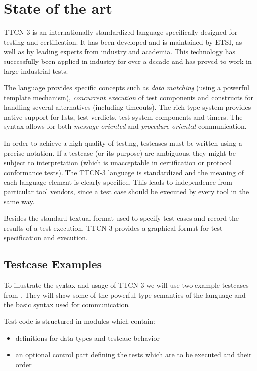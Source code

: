 \chapter{State of the art}
\label{chap:background}

\ac{TTCN-3} is an internationally standardized language
specifically designed for testing and certification.
It has been developed and is maintained by \ac{ETSI},
as well as by leading experts from industry and academia.
This technology has successfully been applied in industry for over a decade
and has proved to work in large industrial tests.

The language provides specific concepts such as
\emph{data matching} (using a powerful template mechanism),
\emph{concurrent execution} of test components
and constructs for handling several alternatives (including timeouts).
The rich type system provides native support for
lists, test verdicts, test system components and timers.
The syntax allows for both \emph{message oriented}
and \emph{procedure oriented} communication.

In order to achieve a high quality of testing,
testcases must be written using a precise notation.
If a testcase (or its purpose) are ambiguous,
they might be subject to interpretation
(which is unacceptable in certification or protocol conformance tests).
The \ac{TTCN-3} language is standardized
and the meaning of each language element is clearly specified.
This leads to independence from particular tool vendors,
since a test case should be executed by every tool in the same way.

Besides the standard textual format used to specify test cases
and record the results of a test execution,
\ac{TTCN-3} provides a graphical format for test specification and execution.


\section{Testcase Examples}

To illustrate the syntax and usage of \ac{TTCN-3}
we will use two example testcases from \citep{ttcn3intro}.
They will show some of the powerful type semantics of the language
and the basic syntax used for communication.

Test code is structured in modules which contain:
\begin{itemize}
\item definitions for data types and testcase behavior
\item an optional control part defining the tests which are to be executed
and their order
\end{itemize}


